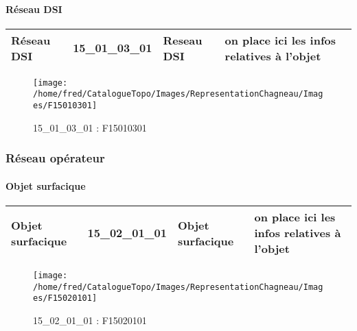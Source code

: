 \documentclass[12pt,titlepage,oneside]{book}
\begin{document}
\paragraph{Réseau DSI}
\noindent
\vspace{\baselineskip}

\renewcommand{\arraystretch}{1.2}
\begin{supertabular}{|p{10cm}|c|p{13cm}|p{12cm}|}
 Réseau DSI & 15\_01\_03\_01 & Reseau DSI & on place ici les infos relatives à l'objet\\
\hline
\end{supertabular}
\begin{figure}[h!]
  \hfill         %
  \begin{minipage}[t]{3cm}
    \begin{center}
      \texttt{[image: /home/fred/CatalogueTopo/Images/RepresentationChagneau/Images/F15010301]}
      \caption[F15010301]{\label{} 15\_01\_03\_01 : F15010301}
    \end{center}
  \end{minipage}
\end{figure}

\subsubsection{\large Réseau opérateur}
\paragraph{Objet surfacique}
\noindent
\vspace{\baselineskip}

\renewcommand{\arraystretch}{1.2}
\begin{supertabular}{|p{10cm}|c|p{13cm}|p{12cm}|}
 Objet surfacique & 15\_02\_01\_01 & Objet surfacique & on place ici les infos relatives à l'objet\\
\hline
\end{supertabular}
\begin{figure}[h!]
  \hfill         %
  \begin{minipage}[t]{3cm}
    \begin{center}
      \texttt{[image: /home/fred/CatalogueTopo/Images/RepresentationChagneau/Images/F15020101]}
      \caption[F15020101]{\label{} 15\_02\_01\_01 : F15020101}
    \end{center}
  \end{minipage}
\end{figure}
\end{document}
